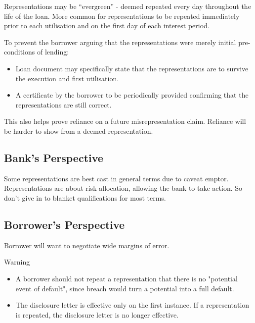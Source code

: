 \documentclass[
]{article}
\providecommand{\tightlist}{%
  \setlength{\itemsep}{0pt}\setlength{\parskip}{0pt}}
\newenvironment{env-9a8b2d5a-e80b-4017-bd60-2afb8ee62329}
{
    \savenotes\tcolorbox[blanker,breakable,left=5pt,borderline west={2pt}{-4pt}{orange}]
}
{
    \endtcolorbox\spewnotes
}
\begin{document}
Representations may be ``evergreen'' - deemed repeated every day
throughout the life of the loan. More common for representations to be
repeated immediately prior to each utilisation and on the first day of
each interest period.

To prevent the borrower arguing that the representations were merely
initial pre-conditions of lending:

\begin{itemize}
\tightlist
\item
  Loan document may specifically state that the representations are to
  survive the execution and first utilisation.
\item
  A certificate by the borrower to be periodically provided confirming
  that the representations are still correct.
\end{itemize}

This also helps prove reliance on a future misrepresentation claim.
Reliance will be harder to show from a deemed representation.

\hypertarget{banks-perspective}{%
\subsection{Bank's Perspective}\label{banks-perspective}}

Some representations are best cast in general terms due to caveat
emptor. Representations are about risk allocation, allowing the bank to
take action. So don't give in to blanket qualifications for most terms.

\hypertarget{borrowers-perspective}{%
\subsection{Borrower's Perspective}\label{borrowers-perspective}}

Borrower will want to negotiate wide margins of error.

\begin{env-9a8b2d5a-e80b-4017-bd60-2afb8ee62329}

Warning

\begin{itemize}
\tightlist
\item
  A borrower should not repeat a representation that there is no
  "potential event of default", since breach would turn a potential into
  a full default.
\item
  The disclosure letter is effective only on the first instance. If a
  representation is repeated, the disclosure letter is no longer
  effective.
\end{itemize}

\end{env-9a8b2d5a-e80b-4017-bd60-2afb8ee62329}
\end{document}
